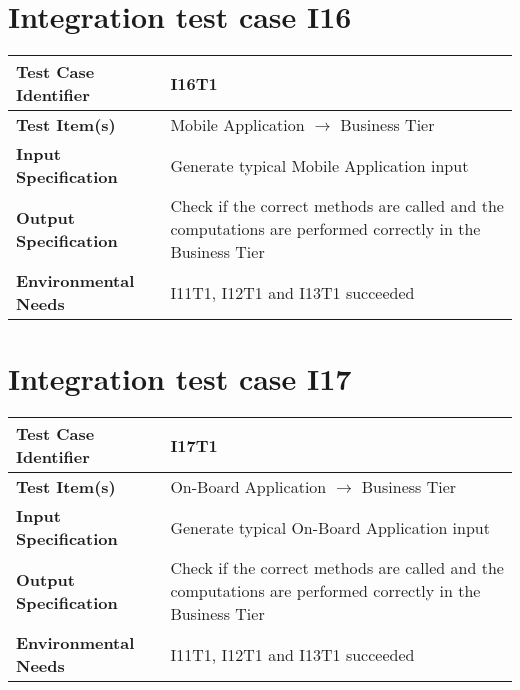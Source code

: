 \section{Integration test case I16}\label{I16}
\begin{center}
	\vspace{0.6cm}
	\begin{tabular}{|l|p{10cm}|}
		\hline
		\textbf{Test Case Identifier} & I16T1 \bigstrut \\\hline
		\textbf{Test Item(s)} & Mobile Application \ensuremath{\rightarrow} Business Tier \bigstrut \\\hline
		\textbf{Input Specification} & Generate typical Mobile Application input \bigstrut \\\hline
		\textbf{Output Specification} & Check if the correct methods are called and the computations are performed correctly in the Business Tier \bigstrut \\\hline
		\textbf{Environmental Needs} & I11T1, I12T1 and I13T1 succeeded \bigstrut \\\hline
	\end{tabular}
\end{center}

\section{Integration test case I17}\label{I17}
\begin{center}
	\vspace{0.6cm}
	\begin{tabular}{|l|p{10cm}|}
		\hline
		\textbf{Test Case Identifier} & I17T1 \bigstrut \\\hline
		\textbf{Test Item(s)} & On-Board Application \ensuremath{\rightarrow} Business Tier \bigstrut \\\hline
		\textbf{Input Specification} & Generate typical On-Board Application input \bigstrut \\\hline
		\textbf{Output Specification} & Check if the correct methods are called and the computations are performed correctly in the Business Tier \bigstrut \\\hline
		\textbf{Environmental Needs} & I11T1, I12T1 and I13T1 succeeded \bigstrut \\\hline
	\end{tabular}
\end{center}